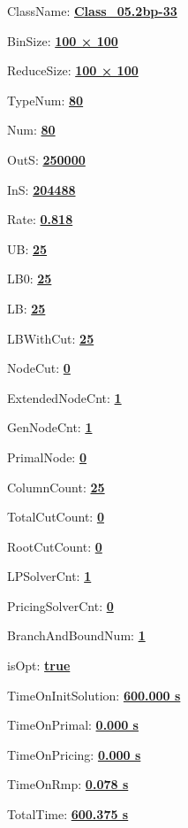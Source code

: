 \documentclass[11pt]{article}
\begin{document}
\pagestyle{empty}


ClassName: \underline{\textbf{Class_05.2bp-33}}
\par
BinSize: \underline{\textbf{100 × 100}}
\par
ReduceSize: \underline{\textbf{100 × 100}}
\par
TypeNum: \underline{\textbf{80}}
\par
Num: \underline{\textbf{80}}
\par
OutS: \underline{\textbf{250000}}
\par
InS: \underline{\textbf{204488}}
\par
Rate: \underline{\textbf{0.818}}
\par
UB: \underline{\textbf{25}}
\par
LB0: \underline{\textbf{25}}
\par
LB: \underline{\textbf{25}}
\par
LBWithCut: \underline{\textbf{25}}
\par
NodeCut: \underline{\textbf{0}}
\par
ExtendedNodeCnt: \underline{\textbf{1}}
\par
GenNodeCnt: \underline{\textbf{1}}
\par
PrimalNode: \underline{\textbf{0}}
\par
ColumnCount: \underline{\textbf{25}}
\par
TotalCutCount: \underline{\textbf{0}}
\par
RootCutCount: \underline{\textbf{0}}
\par
LPSolverCnt: \underline{\textbf{1}}
\par
PricingSolverCnt: \underline{\textbf{0}}
\par
BranchAndBoundNum: \underline{\textbf{1}}
\par
isOpt: \underline{\textbf{true}}
\par
TimeOnInitSolution: \underline{\textbf{600.000 s}}
\par
TimeOnPrimal: \underline{\textbf{0.000 s}}
\par
TimeOnPricing: \underline{\textbf{0.000 s}}
\par
TimeOnRmp: \underline{\textbf{0.078 s}}
\par
TotalTime: \underline{\textbf{600.375 s}}
\par
\newpage


\end{document}
